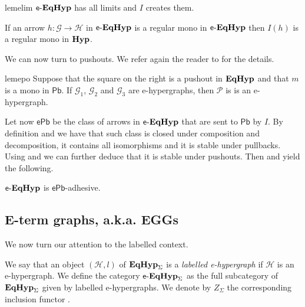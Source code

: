 \documentclass[3p]{elsarticle}
\newcommand{\pbc}{\mathsf{Pb}}
\newcommand{\pbe}{\mathsf{ePb}}
\newcommand{\catname}[1]{\textbf{\textup{#1}}}
\newcommand{\hyp}{\catname{Hyp}}
\newcommand{\EqHyp}{\catname{EqHyp}} %
\newcommand{\egg}{\mathsf{e}\text{-}\catname{EqHyp}}
\theoremstyle{remark}
\theoremstyle{definition}
\begin{document}
\begin{restatable}{lem}{elim}\label{lem:elim}
	$\egg$ has all limits and $I$ creates them.
\end{restatable}


\begin{cor}\label{cor:ereg}
	If an arrow $h: \mathcal{G \to H}$ in $\egg$ is a regular mono in $\egg$ then $I(h)$ is a regular mono in $\hyp$. 
\end{cor}

We can now turn to pushouts. We refer again the reader to  for the details.

\noindent
\begin{minipage}[l]{.83\linewidth}
	\begin{restatable}{lem}{epo}\label{lem:epo}
		Suppose that the square on the right is a pushout in $\EqHyp$ and that $m$ is a mono in $\pbc$. If $\mathcal{G}_1$, $\mathcal{G}_2$ and $\mathcal{G}_3$ are e-hypergraphs, then $\mathcal{P}$ is 
		is an e-hypergraph.
	\end{restatable}
\end{minipage}\hfill 
\begin{minipage}[r]{.15\linewidth}
\end{minipage}

Let now $\pbe$ be the class of arrows in $\egg$ that are sent to $\pbc$ by $I$. By definition and  we have that such class is closed under composition and decomposition, it contains all isomorphisms and it is stable under pullbacks. Using  and  we can further deduce that it is stable under pushouts. Then  and  yield the following.

\begin{cor}\label{cor:pbe}
	$\egg$ is $\pbe$-adhesive.
\end{cor}

\subsection{E-term graphs, a.k.a. EGGs}


We now turn our attention to the labelled context.

\begin{defi} We say that an object $(\mathcal{H}, l)$ of $\EqHyp_\Sigma$ is a \emph{labelled e-hypergraph} if $\mathcal{H}$ is an e-hypergraph. We define the category $\egg_\Sigma$ as the full subcategory of $\EqHyp_\Sigma$ given by labelled e-hypergraphs. We denote by $Z_\Sigma$ the corresponding inclusion functor .
\end{defi}
\end{document}
